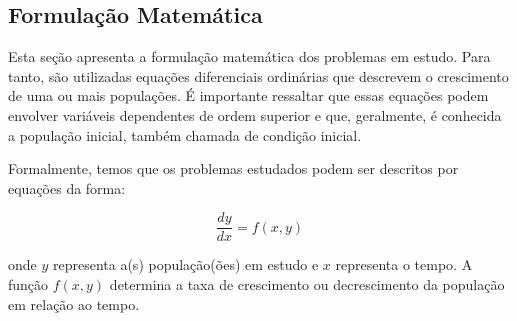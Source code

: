 \subsection{Formulação Matemática}\label{sec:mathematical_formulation}
Esta seção apresenta a formulação matemática dos problemas em estudo. Para tanto, são utilizadas equações diferenciais ordinárias que descrevem o crescimento de uma ou mais populações. É importante ressaltar que essas equações podem envolver variáveis dependentes de ordem superior e que, geralmente, é conhecida a população inicial, também chamada de condição inicial.

Formalmente, temos que os problemas estudados podem ser descritos por equações da forma:

\begin{equation*}
\dfrac{dy}{dx} = f(x,y)
\end{equation*}

onde $y$ representa a(s) população(ões) em estudo e $x$ representa o tempo. A função $f(x,y)$ determina a taxa de crescimento ou decrescimento da população em relação ao tempo.